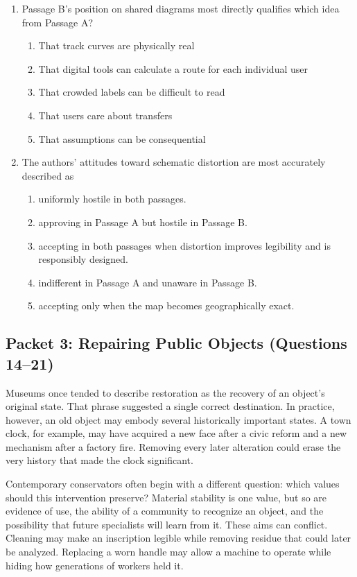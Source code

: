 \begin{enumerate}
\item Passage B's position on shared diagrams most directly qualifies which idea
from Passage A?
  \begin{enumerate}
  \item That track curves are physically real
  \item That digital tools can calculate a route for each individual user
  \item That crowded labels can be difficult to read
  \item That users care about transfers
  \item That assumptions can be consequential
  \end{enumerate}

\item The authors' attitudes toward schematic distortion are most accurately
described as
  \begin{enumerate}
  \item uniformly hostile in both passages.
  \item approving in Passage A but hostile in Passage B.
  \item accepting in both passages when distortion improves legibility and is
        responsibly designed.
  \item indifferent in Passage A and unaware in Passage B.
  \item accepting only when the map becomes geographically exact.
  \end{enumerate}
\end{enumerate}

\subsection*{Packet 3: Repairing Public Objects (Questions 14--21)}

Museums once tended to describe restoration as the recovery of an object's
original state. That phrase suggested a single correct destination. In practice,
however, an old object may embody several historically important states. A town
clock, for example, may have acquired a new face after a civic reform and a new
mechanism after a factory fire. Removing every later alteration could erase the
very history that made the clock significant.

Contemporary conservators often begin with a different question: which values
should this intervention preserve? Material stability is one value, but so are
evidence of use, the ability of a community to recognize an object, and the
possibility that future specialists will learn from it. These aims can conflict.
Cleaning may make an inscription legible while removing residue that could later
be analyzed. Replacing a worn handle may allow a machine to operate while hiding
how generations of workers held it.

